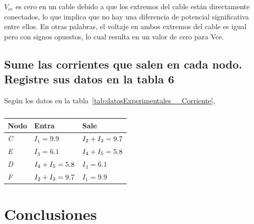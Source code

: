 \documentclass[twocolumn, 12pt]{article}
\begin{document}
$V_{ce}$ es cero en un cable debido a que los extremos del cable
están directamente conectados, lo que implica que no hay
una diferencia de potencial significativa entre ellos. En
otras palabras, el voltaje en ambos extremos del cable es
igual pero con signos opuestos, lo cual resulta en un valor
de cero para Vce.

\subsection{Sume las corrientes que salen en cada nodo. Registre sus datos en la tabla 6}

Según los datos en la tabla~\ref{tab:datosExperimentales__Corriente},

\begin{table}[H]
    \captionsetup{justification=centering}
    \centering

    \begin{tabularx}{0.9\linewidth}{|>{\centering\arraybackslash}X|>{\centering\arraybackslash}X|>{\centering\arraybackslash}X|}
        \hline
        \textbf{Nodo} & \textbf{Entra}               & \textbf{Sale}                \\\hline

        \textit{C}    & $I_1 = 9.9$                  & $I_2 + I_3 \linebreak = 9.7$ \\\hline

        \textit{E}    & $I_3 = 6.1$                  & $I_4 + I_5 \linebreak = 5.8$ \\\hline

        \textit{D}    & $I_4 + I_5 \linebreak = 5.8$ & $I_3 = 6.1$                  \\\hline

        \textit{F}    & $I_2 + I_3 \linebreak = 9.7$ & $I_1 = 9.9$                  \\\hline

    \end{tabularx}
    \caption{}

    \label{tab:analisisDatos__6}
\end{table}

\section{Conclusiones}

\printbibliography
\end{document}
